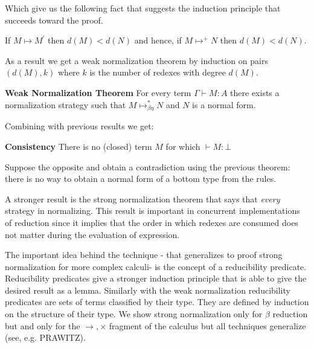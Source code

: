Which give us the following fact that suggests the induction principle that succeeds toward the proof.
\begin{mdframed}
	\begin{theorem}
If $M\mapsto M^{\prime}$ then $d(M)<d(N)$ and hence, if $M\mapsto^{+} N$ then $d(M)<d(N)$.
\end{theorem}
\end{mdframed}
As a result we get a weak  normalization theorem by induction on pairs $(d(M),k)$ where $k$ is the number of redexes with degree $d(M)$.
\begin{mdframed}
\begin{theorem}
	\textbf{Weak Normalization Theorem}
For every term $\Gamma\vdash M:A$ there exists a normalization strategy such that $M\mapsto_{\beta\eta}^{*}N$ and $N$ is a normal form.
\end{theorem}
\end{mdframed} 

Combining with previous results we get:
\begin{theorem}
\begin{mdframed}
\textbf{Consistency}
There is no (closed) term $M$ for which $\vdash M:\bot$ 
\end{mdframed}
\end{theorem}
 Suppose the opposite and obtain a contradiction using the previous theorem: there is no way to obtain a normal form of a bottom type from the rules.  
 
 A stronger result is the strong normalization theorem that says that \textit{every} strategy in normalizing. This result is important in concurrent implementations of reduction since it implies that the order in which redexes are consumed does not matter during the evaluation of  expression. 
 
 The important idea behind the technique - that generalizes to proof strong normalization for more complex calculi- is the concept of a reducibility predicate. Reducibility predicates give a stronger induction principle that is able to give the desired result as a lemma. Similarly with the weak normalization reducibility predicates are sets of terms classified by their type.
 They are defined by induction on the structure of their type. We show strong normalization only for $\beta$ reduction but and only for the $\rightarrow, \times$ fragment of the calculus but all techniques generalize (see, e.g. PRAWITZ). 
 
